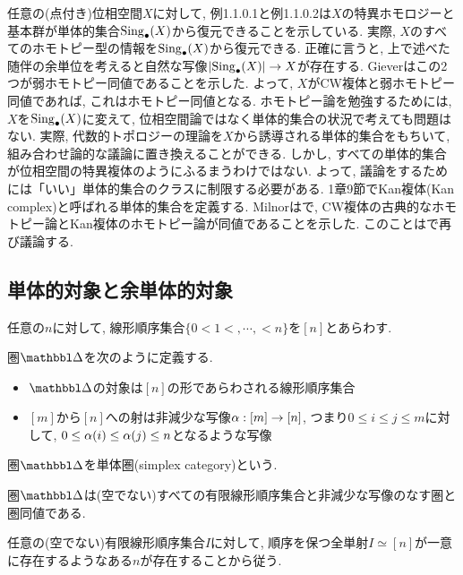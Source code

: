 \documentclass[uplatex, a4paper, 14Q, dvipdfmx]{jsreport}
\begin{document}
任意の(点付き)位相空間$X$に対して, 例1.1.0.1と例1.1.0.2は$X$の特異ホモロジーと基本群が単体的集合$\mathrm{Sing}_\bullet(X)$から復元できることを示している. 
実際, $X$のすべてのホモトピー型の情報を$\mathrm{Sing}_\bullet(X)$から復元できる. 
正確に言うと, 上で述べた随伴の余単位を考えると自然な写像$|\mathrm{Sing}_\bullet(X)| \to X$が存在する. 
Gieverはこの2つが弱ホモトピー同値であることを示した. 
よって, $X$がCW複体と弱ホモトピー同値であれば, これはホモトピー同値となる. \cite[\href{https://kerodon.net/tag/013X}{Tag 013X}]{kerodon}
ホモトピー論を勉強するためには, $X$を$\mathrm{Sing}_\bullet(X)$に変えて, 位相空間論ではなく単体的集合の状況で考えても問題はない.
実際, 代数的トポロジーの理論を$X$から誘導される単体的集合をもちいて, 組み合わせ論的な議論に置き換えることができる. 
しかし, すべての単体的集合が位相空間の特異複体のようにふるまうわけではない. 
よって, 議論をするためには「いい」単体的集合のクラスに制限する必要がある. 
1章9節でKan複体(Kan complex)と呼ばれる単体的集合を定義する. 
Milnorは\cite{MJ2}で, CW複体の古典的なホモトピー論とKan複体のホモトピー論が同値であることを示した. 
このことは\cite[\href{https://kerodon.net/tag/00SY}{Tag 00SY}]{kerodon}で再び議論する. 

\subsection{単体的対象と余単体的対象}

\begin{nota}
  任意の$n$に対して, 線形順序集合$\{0 < 1<, \cdots,< n\}$を$[n]$とあらわす. 
\end{nota}  

\begin{definition}
  圏$\csim$を次のように定義する. 
  \begin{itemize}
    \item $\csim$の対象は$[n]$の形であらわされる線形順序集合
    \item $[m]$から$[n]$への射は非減少な写像$\alpha: [m] \to [n]$, つまり$0 \leq i \leq j \leq m$に対して, $0 \leq \alpha(i) \leq \alpha(j) \leq n$となるような写像
  \end{itemize}
  圏$\csim$を単体圏(simplex category)という. 
\end{definition} 

\begin{remark}
  圏$\csim$は(空でない)すべての有限線形順序集合と非減少な写像のなす圏と圏同値である. 
\end{remark} 

\begin{Proof}
  任意の(空でない)有限線形順序集合$I$に対して, 順序を保つ全単射$I \simeq [n]$が一意に存在するようなある$n$が存在することから従う. 
\end{Proof}
\end{document}
